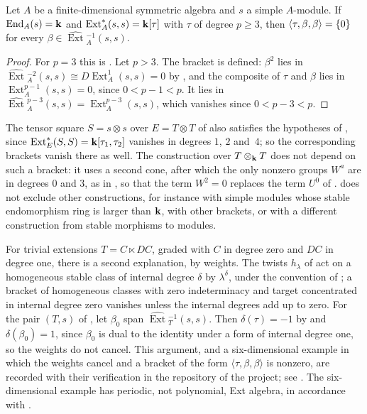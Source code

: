 \begin{corollary}
  \label{coro:tate-obstruction}
  Let $A$ be a finite-dimensional symmetric algebra and $s$ a simple
  $A$-module. If ${\operatorname{End}_A(s)=\mathbf{k}}$ and
  ${\operatorname{Ext}^*_A(s,s)=\mathbf{k}[\tau]}$
  with $\tau$ of degree ${p\geq3}$, then ${\langle\tau,\beta,\beta\rangle=\set{0}}$
  for every ${\beta\in\widehat{\operatorname{Ext}}{}^{-1}_A(s,s)}$.
\end{corollary}

\begin{proof}
  For ${p=3}$ this is . Let ${p>3}$. The bracket is
  defined: ${\beta^2}$ lies in
  ${\widehat{\operatorname{Ext}}{}^{-2}_A(s,s)\cong
  D\operatorname{Ext}^1_A(s,s)=0}$ by , and the
  composite of $\tau$ and $\beta$ lies in ${\operatorname{Ext}^{p-1}_A(s,s)=0}$,
  since ${0<p-1<p}$. It lies in
  ${\widehat{\operatorname{Ext}}{}^{p-3}_A(s,s)}={\operatorname{Ext}^{p-3}_A(s,s)}$,
  which vanishes since ${0<p-3<p}$.
\end{proof}

The tensor square ${S=s\otimes s}$ over ${E=T\otimes T}$ of 
also satisfies the hypotheses of , since
${\operatorname{Ext}^*_E(S,S)=\mathbf{k}[\tau_1,\tau_2]}$ vanishes in degrees $1$, $2$
and~$4$; so the corresponding brackets vanish there as well. The construction
over ${T\otimes_{\mathbf{k}} T}$ does not depend on such a bracket: it uses a second cone,
after which the only nonzero groups $W^a$ are in degrees $0$ and $3$, as in
, so that the term ${W^2=0}$ replaces the term $U^0$
of .  does not exclude
other constructions, for instance with simple modules whose stable
endomorphism ring is larger than $\mathbf{k}$, with other brackets, or with a different
construction from stable morphisms to modules.

\begin{remark}
  \label{rem:weights}
  For trivial extensions ${T=C\ltimes DC}$, graded with $C$ in degree zero and
  $DC$ in degree one, there is a second explanation, by weights. The twists
  $h_\lambda$ of  act on a homogeneous stable class of
  internal degree $\delta$ by $\lambda^{\delta}$, under the convention of
  ; a bracket of homogeneous classes with zero indeterminacy
  and target concentrated in internal degree zero vanishes unless the
  internal degrees add up to zero. For the pair $(T,s)$ of
  , let $\beta_0$ span
  $\widehat{\operatorname{Ext}}{}^{-1}_T(s,s)$. Then ${\delta(\tau)=-1}$ by
   and ${\delta(\beta_0)=1}$, since
  $\beta_0$ is dual to the identity under a form of internal degree one, so
  the weights do not cancel. This argument, and a six-dimensional example in
  which the weights cancel and a bracket of the form $\langle\tau,\beta,\beta\rangle$ is
  nonzero, are
  recorded with their verification in the repository of the project; see
  . The six-dimensional example has periodic, not
  polynomial, Ext algebra, in accordance with .
\end{remark}

